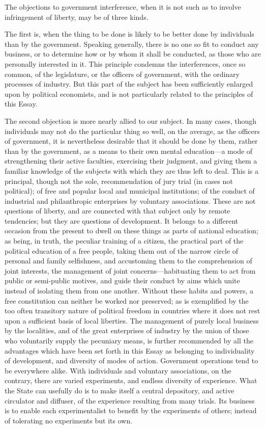 \documentclass[11pt,openany]{book}
\begin{document}
The objections to government interference, when it is not such as to involve infringement of liberty, may be of three kinds.

The first is, when the thing to be done is likely to be better done by individuals than by the government. Speaking generally, there is no one so fit to conduct any business, or to determine how or by whom it shall be conducted, as those who are personally interested in it. This principle condemns the interferences, once so common, of the legislature, or the officers of government, with the ordinary processes of industry. But this part of the subject has been sufficiently enlarged upon by political economists, and is not particularly related to the principles of this Essay.

The second objection is more nearly allied to our subject. In many cases, though individuals may not do the particular thing so well, on the average, as the officers of government, it is nevertheless desirable that it should be done by them, rather than by the government, as a means to their own mental education---a mode of strengthening their active faculties, exercising their judgment, and giving them a familiar knowledge of the subjects with which they are thus left to deal. This is a principal, though not the sole, recommendation of jury trial (in cases not political); of free and popular local and municipal institutions; of the conduct of industrial and philanthropic enterprises by voluntary associations. These are not questions of liberty, and are connected with that subject only by remote tendencies; but they are questions of development. It belongs to a different occasion from the present to dwell on these things as parts of national education; as being, in truth, the peculiar training of a citizen, the practical part of the political education of a free people, taking them out of the narrow circle of personal and family selfishness, and accustoming them to the comprehension of joint interests, the management of joint concerns---habituating them to act from public or semi-public motives, and guide their conduct by aims which unite instead of isolating them from one another. Without these habits and powers, a free constitution can neither be worked nor preserved; as is exemplified by the too often transitory nature of political freedom in countries where it does not rest upon a sufficient basis of local liberties. The management of purely local business by the localities, and of the great enterprises of industry by the union of those who voluntarily supply the pecuniary means, is further recommended by all the advantages which have been set forth in this Essay as belonging to individuality of development, and diversity of modes of action. Government operations tend to be everywhere alike. With individuals and voluntary associations, on the contrary, there are varied experiments, and endless diversity of experience. What the State can usefully do is to make itself a central depository, and active circulator and diffuser, of the experience resulting from many trials. Its business is to enable each experimentalist to benefit by the experiments of others; instead of tolerating no experiments but its own.
\end{document}
